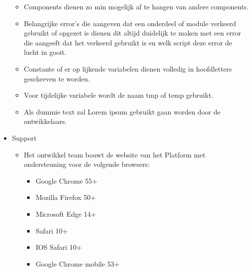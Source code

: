\documentclass[]{report}
\begin{document}
\begin{itemize}
\begin{itemize}
		\item Components dienen zo min mogelijk af te hangen van andere components.
		\item Belangrijke error's die aangeven dat een onderdeel of module verkeerd gebruikt of opgezet is dienen dit altijd duidelijk te maken met een error die aangeeft dat het verkeerd gebruikt is en welk script deze error de lucht in gooit.
		\item Constante of er op lijkende variabelen dienen volledig in hoofdletters geschreven te worden.
		\item Voor tijdelijke variabele wordt de naam tmp of temp gebruikt. 
		\item Als dummie text zal Lorem ipsum gebruikt gaan worden door de ontwikkelaars.
		\newline
	\end{itemize}

	\item Support
	\begin{itemize}
		\item Het ontwikkel team bouwt de website van het Platform met ondersteuning voor de volgende browsers:
			\begin{itemize}
			\item Google Chrome 55+
			\item Mozilla Firefox 50+
			\item Microsoft Edge 14+
			\item Safari 10+
			\item IOS Safari 10+
			\item Google Chrome mobile 53+
			\newline
			\end{itemize}
	\end{itemize}
	


\end{itemize}
\end{document}
